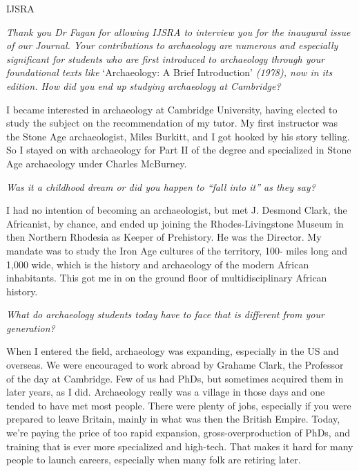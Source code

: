\begin{labeling}{IJSRA}	
\item[IJSRA (International Journal of Student Research in Archaeology)] \textit{Thank you Dr Fagan for allowing IJSRA to interview you for the inaugural issue of our Journal. Your contributions to archaeology are numerous and especially significant for students who are first introduced to archaeology through your foundational texts like} ‘Archaeology: A Brief Introduction’ \textit{(1978), now in its  edition. \newline
How did you end up studying archaeology at Cambridge?}
	
\item[BMF (Dr. Brian M Fagan)] I became interested in archaeology at Cambridge University, having elected to study the subject on the recommendation of my tutor. My first instructor was the Stone Age archaeologist, Miles Burkitt, and I got hooked by his story telling. So I stayed on with archaeology for Part II of the degree and specialized in Stone Age archaeology under Charles McBurney.

\item[IJSRA]\textit{Was it a childhood dream or did you happen to “fall into it” as they say?}

\item[BMF] I had no intention of becoming an archaeologist, but met J. Desmond Clark, the Africanist, by chance, and ended up joining the Rhodes-Livingstone Museum in then Northern Rhodesia as Keeper of Prehistory. He was the Director. My mandate was to study the Iron Age cultures of the territory, 100- miles long and 1,000 wide, which is the history and archaeology of the modern African inhabitants. This got me in on the ground floor of multidisciplinary African history.

\item[IJSRA]\textit{What do archaeology students today have to face that is different from your generation?}

\item[BMF] When I entered the field, archaeology was expanding, especially in the US and overseas. We were encouraged to work abroad by Grahame Clark, the Professor of the day at Cambridge. Few of us had PhDs, but sometimes acquired them in later years, as I did. Archaeology really was a village in those days and one tended to have met most people. There were plenty of jobs, especially if you were prepared to leave Britain, mainly in what was then the British Empire. Today, we’re paying the price of too rapid expansion, gross-overproduction of PhDs, and training that is ever more specialized and high-tech. That makes it hard for many people to launch careers, especially when many folk are retiring later.
	

\end{labeling}
